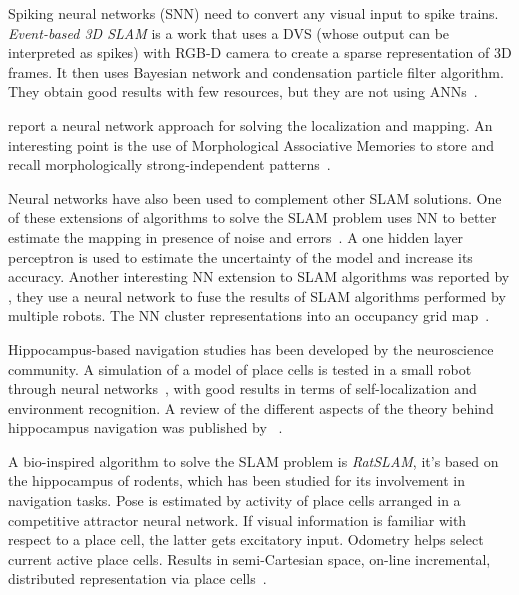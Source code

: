 Spiking neural networks (SNN) need to convert any visual input to spike trains. \emph{Event-based 3D SLAM} is a work that uses a DVS (whose output can be interpreted as spikes) with RGB-D camera to create a sparse representation of 3D frames. It then uses Bayesian network and condensation particle filter algorithm. They obtain good results with few resources, but they are not using ANNs~\cite{Weikersdorfer2014}.

\citeauthor{villaverde2006morphological} report a neural network approach for solving the localization and mapping. An interesting point is the use of Morphological Associative Memories to store and recall morphologically strong-independent patterns~\cite{villaverde2006morphological}. 

Neural networks have also been used to complement other SLAM solutions. One of these extensions of algorithms to solve the SLAM problem uses NN to better estimate the mapping in presence of noise and errors~\cite{choi2007neural}. A one hidden layer perceptron is used to estimate the uncertainty of the model and increase its accuracy. Another interesting NN extension to SLAM algorithms was reported by \citeauthor{saeedi2011neural}, they use a neural network to fuse the results of SLAM algorithms performed by multiple robots. The NN cluster representations into an occupancy grid map~\cite{saeedi2011neural}.

Hippocampus-based navigation studies has been developed by the neuroscience community. A simulation of a model of place cells is tested in a small robot through neural networks~\cite{burgess1997robotic}, with good results in terms of self-localization and environment recognition. A review of the different aspects of the theory behind hippocampus navigation was published by \citeauthor{sunderhauf2010learning}~\cite{sunderhauf2010learning}. 

A bio-inspired algorithm to solve the SLAM problem is \emph{RatSLAM}, it's based on the hippocampus of rodents, which has been studied for its involvement in navigation tasks. Pose is estimated by activity of place cells arranged in a competitive attractor neural network. If visual information is familiar with respect to a place cell, the latter gets excitatory input. Odometry helps select current active place cells. Results in semi-Cartesian space, on-line incremental, distributed representation via place cells~\cite{rat-slam,milford2008robot}.